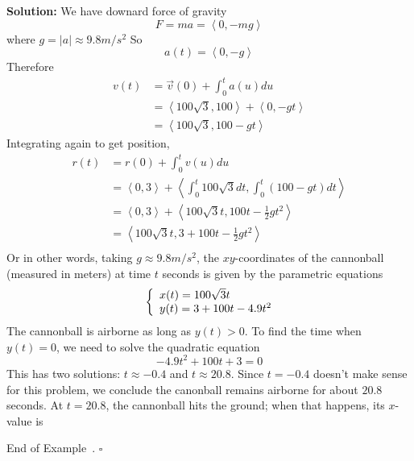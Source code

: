 \documentclass[10pt]{article}
\theoremstyle{definition}
\newtheorem{example}[theorem]{Example}
\renewenvironment{example}
{\begin{oldexample}}
  {\par\smallskip\hfill   End of Example~\theexample. $\square$    \par\end{oldexample}}
\newcommand{\1}[1]{\textbf{1}_{\left[#1\right]}} %
\begin{document}
\begin{example}
  \textbf{Solution:}
  We have downard force of gravity
  \begin{equation*}
    F = ma = \left\langle 0,-mg \right\rangle 
  \end{equation*}
  where $g=|a| \approx 9.8 m/s^{2}$
  So
  \begin{equation*}
    a(t) = \left\langle 0,-g \right\rangle 
  \end{equation*}
  Therefore
  \begin{align*}
    v(t) 
    &= \vec{v}(0) + \int_{0}^{t} a(u)du\\
    &= \left\langle 100 \sqrt{3},100 \right\rangle + \left\langle 0,-g t \right\rangle\\  
    &= \left\langle 100 \sqrt{3}, 100-gt \right\rangle 
  \end{align*}
  Integrating again to get position,
  \begin{align*}
    r(t) 
    &= r(0)+\int_{0}^{t} v(u)du\\ 
    &= \left\langle 0,3 \right\rangle  + \left\langle \int_{0}^{t}100 \sqrt{3} dt, \int_{0}^{t}(100-gt)dt    \right\rangle\\ 
    &= \left\langle 0,3 \right\rangle  + \left\langle 100 \sqrt{3}t, 100t-\frac{1}{2}gt^{2}    \right\rangle\\ 
    &= \left\langle 100 \sqrt{3}t, 3+100t-\frac{1}{2}gt^{2}    \right\rangle\\ 
  \end{align*}
  Or in other words, taking $g\approx 9.8 m/s^{2}$, the $xy$-coordinates of the cannonball (measured in
  meters) at time $t$ seconds is given by the parametric equations
  \begin{equation}\label{eq:8}
    \left\{ \begin{array}{l@{}l}
        x(t) = 100 \sqrt{3}t \\
        y(t) = 3+100 t - 4.9t^{2}
      \end{array}\right.
  \end{equation}
  The cannonball is airborne as long as $y(t)>0$. To find the time when $y(t)=0$, we need to solve the
  quadratic equation
  \begin{equation*}
    -4.9t^{2}+ 100 t +3=0
  \end{equation*}
  This has two solutions: $t\approx -0.4$ and $t\approx 20.8$. Since $t=-0.4$
  doesn't make sense for this problem, we conclude the canonball remains
  airborne for about $20.8$ seconds. At $t=20.8$, the cannonball hits the
  ground; when that happens, its $x$-value is
  \begin{equation*}

\end{equation*}
\end{example}
\end{document}
